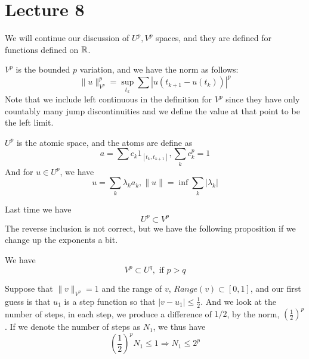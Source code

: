 \section{Lecture 8}
We will continue our discussion of $U^p, V^p$ spaces, and they are defined for functions defined on $\mathbb{R}$.

\begin{definition}[$U^p, V^p$]
    $V^p$ is the bounded $p$ variation, and we have the norm as follows:
    \begin{equation*}
        \|u\|_{V^p}^p=\sup_{t_k}\sum|u(t_{k+1}-u(t_k))|^p
    \end{equation*}
    Note that we include left continuous in the definition for $V^p$ since they have only countably many jump discontinuities and we define the value at that point to be the left limit.

    $U^p$ is the atomic space, and the atoms are define as
    \begin{equation*}
        a=\sum c_k1_{[t_k, t_{k+1}]}, \sum_k c_k^p=1
    \end{equation*}
    And for $u\in U^p$, we have
    \begin{equation*}
        u=\sum_k\lambda_k a_k, \|u\|=\inf\sum_k|\lambda_k|
    \end{equation*}
\end{definition}

Last time we have
\begin{equation*}
    U^p\subset V^p
\end{equation*}
The reverse inclusion is not correct, but we have the following proposition if we change up the exponents a bit.
\begin{proposition}
    We have
    \begin{equation*}
        V^p\subset U^q, \text{ if } p>q
    \end{equation*}
\end{proposition}
Suppose that $\|v\|_{V^p}=1$ and the range of $v$, $Range(v)\subset [0,1]$, and our first guess is that $u_1$ is a step function so that $|v-u_1|\leq\frac{1}{2}$. And we look at the number of steps, in each step, we produce a difference of $1/2$, by the norm, $\left(\frac{1}{2}\right)^p$. If we denote the number of steps as $N_1$, we thus have
\begin{equation*}
    \left(\frac{1}{2}\right)^pN_1\leq 1\Rightarrow N_1\leq 2^p
\end{equation*}

